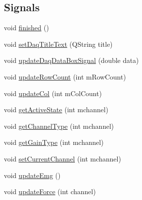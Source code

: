 \subsection*{Signals}
\begin{DoxyCompactItemize}
\item 
void \hyperlink{class_mcc_daq_interface_a6bd42e5902e34571262f1fe1b1eb987c}{finished} ()
\item 
void \hyperlink{class_mcc_daq_interface_aaaf6dfded2d522b1310c7f7dc3171168}{set\+Daq\+Title\+Text} (Q\+String title)
\item 
void \hyperlink{class_mcc_daq_interface_a86cd2addd88adddadaccae76d3cf0b22}{update\+Daq\+Data\+Box\+Signal} (double data)
\item 
void \hyperlink{class_mcc_daq_interface_ac8075afce0aa1f4fc95a9fba13ac60ef}{update\+Row\+Count} (int m\+Row\+Count)
\item 
void \hyperlink{class_mcc_daq_interface_ad055cd5057d78af30c9f97ffef48f6bc}{update\+Col} (int m\+Col\+Count)
\item 
void \hyperlink{class_mcc_daq_interface_ac2e329b0d2d52885d1fe96c64df3331a}{get\+Active\+State} (int mchannel)
\item 
void \hyperlink{class_mcc_daq_interface_a42ca742cf207cb615c5b7f9a172dcb8b}{get\+Channel\+Type} (int mchannel)
\item 
void \hyperlink{class_mcc_daq_interface_a5df873d4cee50cf834fa7e5b3b65cab6}{get\+Gain\+Type} (int mchannel)
\item 
void \hyperlink{class_mcc_daq_interface_a3332c6e8afb289d24a23ef0c08596473}{set\+Current\+Channel} (int mchannel)
\item 
void \hyperlink{class_mcc_daq_interface_a66f961728aca729d4a93930d695b6cb9}{update\+Emg} ()
\item 
void \hyperlink{class_mcc_daq_interface_ac56b39d573200c4fe2f5b5935405fd6f}{update\+Force} (int channel)
\end{DoxyCompactItemize}
